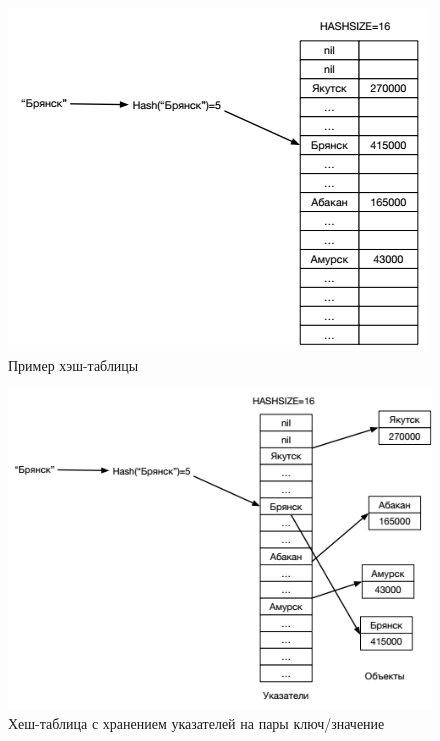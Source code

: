 \documentclass{beamer}
\begin{document}
\begin{frame}
	\begin{figure}[h]
		\centering
		\includegraphics[scale=0.75]{images/lec08-pic12.png}
		\caption{Пример хэш-таблицы}
	\end{figure}
\end{frame}

\begin{frame}
	\begin{figure}[h]
		\centering
		\includegraphics[scale=0.75]{images/lec08-pic13.png}
		\caption{Хеш-таблица с хранением указателей на пары ключ/значение}
	\end{figure}
\end{frame}
\end{document}
